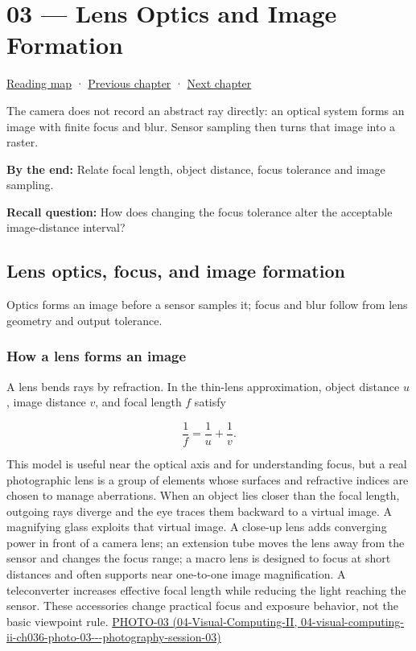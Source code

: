 \hypertarget{03-visual-computing-i-ch003}{}
\chapter{03 --- Lens Optics and Image Formation}\label{03-visual-computing-i-ch003-lens-optics-and-image-formation}

\hyperref[volume-reading-map]{Reading map} · \hyperref[03-visual-computing-i-ch002-surfaces-topology-and-parameterization]{Previous chapter} · \hyperref[03-visual-computing-i-ch004-sampling-filtering-and-reconstruction]{Next chapter}

The camera does not record an abstract ray directly: an optical system forms an image with finite focus and blur. Sensor sampling then turns that image into a raster.

\textbf{By the end:} Relate focal length, object distance, focus tolerance and image sampling.

\textbf{Recall question:} How does changing the focus tolerance alter the acceptable image-distance interval?

\section{Lens optics, focus, and image formation}\label{03-visual-computing-i-ch003-lens-optics-focus-and-image-formation}

Optics forms an image before a sensor samples it; focus and blur follow from lens geometry and output tolerance.

\subsection{How a lens forms an image}\label{03-visual-computing-i-ch003-how-a-lens-forms-an-image}

A lens bends rays by refraction. In the thin-lens approximation, object distance \(u\), image distance \(v\), and focal length \(f\) satisfy

\[
\frac{1}{f}=\frac{1}{u}+\frac{1}{v}.
\]

This model is useful near the optical axis and for understanding focus, but a real photographic lens is a group of elements whose surfaces and refractive indices are chosen to manage aberrations. When an object lies closer than the focal length, outgoing rays diverge and the eye traces them backward to a virtual image. A magnifying glass exploits that virtual image. A close-up lens adds converging power in front of a camera lens; an extension tube moves the lens away from the sensor and changes the focus range; a macro lens is designed to focus at short distances and often supports near one-to-one image magnification. A teleconverter increases effective focal length while reducing the light reaching the sensor. These accessories change practical focus and exposure behavior, not the basic viewpoint rule. \href{../04-Visual-Computing-II/main.pdf\#nameddest=04-visual-computing-ii-ch036-photo-03---photography-session-03}{PHOTO-03 (04-Visual-Computing-II, 04-visual-computing-ii-ch036-photo-03-\/-\/-photography-session-03)}

